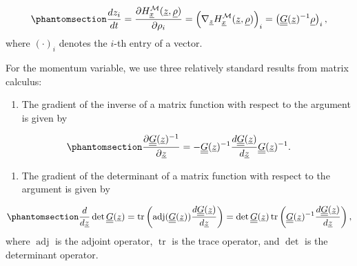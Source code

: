 \documentclass[
]{scrartcl}
\providecommand{\tightlist}{%
  \setlength{\itemsep}{0pt}\setlength{\parskip}{0pt}}
\begin{document}
\begin{refsection}
\begin{equation}\phantomsection\label{eq-gradient-hamiltonian-position-rhmc}{
\frac{d z_i}{d t} = 
\frac{\partial H_{\underline{x}}^{\mathcal{M}}(\underline{z}, \underline{\rho})}
{
    \partial \rho_i
} = 
\left(
    \nabla_{\underline{z}} H_{\underline{x}}^{\mathcal{M}}
    (\underline{z}, \underline{\rho})
\right)_i = 
\left(
    \underline{\underline{G}}(\underline{z})^{-1} \underline{\rho}
\right)_i,
}\end{equation} where \(\left(\cdot\right)_i\) denotes the \(i\)-th
entry of a vector.

For the momentum variable, we use three relatively standard results from
matrix calculus:

\begin{enumerate}
\def\labelenumi{\arabic{enumi}.}
\tightlist
\item
  The gradient of the inverse of a matrix function with respect to the
  argument is given by
\end{enumerate}

\begin{equation}\phantomsection\label{eq-gradient-inverse-matrix}{
\frac{
    \partial \underline{\underline{G}}(\underline{z})^{-1}
}{
    \partial \underline{z}
} = 
-\underline{\underline{G}}(\underline{z})^{-1} 
\frac{d \underline{\underline{G}}(\underline{z})}{d \underline{z}} 
\underline{\underline{G}}(\underline{z})^{-1}.
}\end{equation}

\begin{enumerate}
\def\labelenumi{\arabic{enumi}.}
\setcounter{enumi}{1}
\tightlist
\item
  The gradient of the determinant of a matrix function with respect to
  the argument is given by
\end{enumerate}

\begin{equation}\phantomsection\label{eq-gradient-determinant-matrix}{
\frac{
    d
}{
    d \underline{z}
} \operatorname{det} \underline{\underline{G}}(\underline{z}) = 
\operatorname{tr}\left(
    \operatorname{adj}(\underline{\underline{G}}(\underline{z})) 
    \frac{d \underline{\underline{G}}(\underline{z})}{d \underline{z}}
\right) = 
\operatorname{det} \underline{\underline{G}}(\underline{z}) 
\operatorname{tr}\left(
    \underline{\underline{G}}(\underline{z})^{-1} 
    \frac{d \underline{\underline{G}}(\underline{z})}{d \underline{z}}
\right),
}\end{equation} where \(\operatorname{adj}\) is the adjoint operator,
\(\operatorname{tr}\) is the trace operator, and \(\operatorname{det}\)
is the determinant operator.


\end{refsection}
\end{document}
